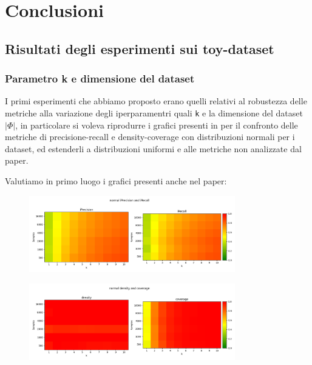 \chapter{Conclusioni}\label{ch:conclusioni}

\section{Risultati degli esperimenti sui toy-dataset}

\subsection{Parametro k e dimensione del dataset}

I primi esperimenti che abbiamo proposto erano quelli relativi al robustezza delle metriche alla variazione degli iperparamentri quali \texttt{k} e la dimensione del dataset \(|\Phi|\),
in particolare si voleva riprodurre i grafici presenti in \cite{3ReliableFidelityDiversityMetrics} per il confronto delle metriche di precisione-recall e density-coverage con distribuzioni normali per i dataset, ed estenderli a distribuzioni uniformi e alle metriche non analizzate dal paper.

Valutiamo in primo luogo i grafici presenti anche nel paper:

\begin{figure}[h!]
    \centering
    \includegraphics[width=0.8\textwidth]{../images/toyexperiments/kdim/normal_iPrecision_iRecall.png} 
\end{figure}

\begin{figure}[h!]
    \centering
    \includegraphics[width=0.8\textwidth]{../images/toyexperiments/kdim/normal_density_coverage.png} 
\end{figure}

